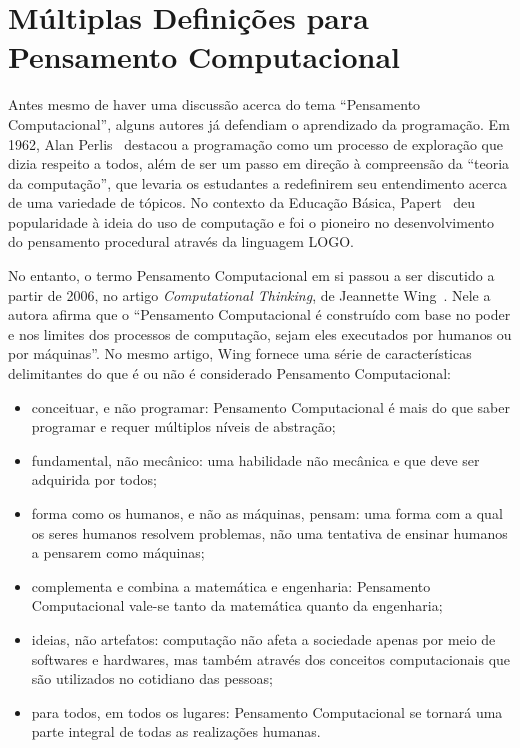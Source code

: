 \section{Múltiplas Definições para Pensamento Computacional} \label{sec:definicao_pc}

Antes mesmo de haver uma discussão acerca do tema “Pensamento Computacional”, alguns autores já defendiam o aprendizado da programação. Em 1962, Alan Perlis~\cite{guzdial_paving_2008} destacou  a programação como um processo de exploração que dizia respeito a todos, além de ser um passo em direção à compreensão da “teoria da computação”, que levaria os estudantes a redefinirem seu entendimento acerca de uma variedade de tópicos. No contexto da Educação Básica, Papert~\cite{papert1994children} deu popularidade à ideia do uso de computação e foi o pioneiro no desenvolvimento do pensamento procedural através da linguagem LOGO.

No entanto, o termo Pensamento Computacional em si passou a ser discutido a partir de 2006, no artigo \textit{Computational Thinking}, de Jeannette Wing~\cite{wing_computational_2006}. Nele a autora afirma que o “Pensamento Computacional é construído com base no poder e nos limites dos processos de computação, sejam eles executados por humanos ou por máquinas”. No mesmo artigo, Wing fornece uma série de características delimitantes do que é ou não é considerado Pensamento Computacional: 

\begin{itemize}
\item conceituar, e não programar: Pensamento Computacional é mais do que saber programar e requer múltiplos níveis de abstração;
\item fundamental, não mecânico: uma habilidade não mecânica e que deve ser adquirida por todos;
\item forma como os humanos, e não as máquinas, pensam:  uma forma com a qual os seres humanos resolvem problemas, não uma tentativa de ensinar humanos a pensarem como máquinas;
\item complementa e combina a matemática e engenharia: Pensamento Computacional vale-se tanto da matemática quanto da engenharia;
\item ideias, não artefatos: computação não afeta a sociedade apenas por meio de softwares e hardwares, mas também através dos conceitos computacionais que são utilizados no cotidiano das pessoas;
\item para todos, em todos os lugares: Pensamento Computacional se tornará uma parte integral de todas as realizações humanas.
\end{itemize}

